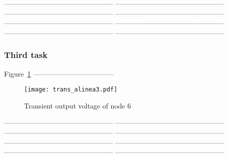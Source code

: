 -----------------------------------------------
-----------------------------------------------
-----------------------------------------------
-----------------------------------------------
-----------------------------------------------
-----------------------------------------------
-----------------------------------------------
-----------------------------------------------



\subsubsection{Third task}

Figure~\ref{fig:trans_al3} ----------------------------------- 

\begin{figure}[H] \centering
  \texttt{[image: trans\_alinea3.pdf]}
  \caption{Transient output voltage of node 6 }
  \label{fig:trans_al3}
  \end{figure}

-----------------------------------------------
-----------------------------------------------
-----------------------------------------------
-----------------------------------------------
-----------------------------------------------
-----------------------------------------------
-----------------------------------------------
-----------------------------------------------

